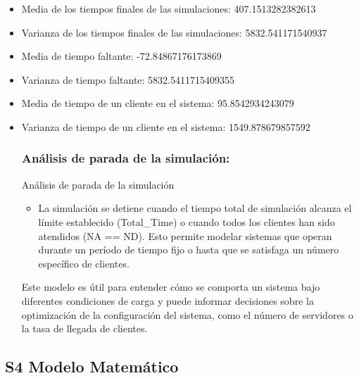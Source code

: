 \documentclass[
]{article}
\providecommand{\tightlist}{%
  \setlength{\itemsep}{0pt}\setlength{\parskip}{0pt}}
\begin{document}
\begin{itemize}
 \item
 Media de los tiempos finales de las simulaciones: 407.1513282382613
 \item
 Varianza de los tiempos finales de las simulaciones: 5832.541171540937
 \item
 Media de tiempo faltante: -72.84867176173869
 \item
 Varianza de tiempo faltante: 5832.5411715409355
 \item
 Media de tiempo de un cliente en el sistema: 95.8542934243079
 \item
 Varianza de tiempo de un cliente en el sistema: 1549.878679857592


 \hypertarget{anal-parada}{%
 \subsubsection{Análisis de parada de la simulación:}\label{anal-parada}}
  Análisis de parada de la simulación

  \begin{itemize}
  \tightlist
  \item
    La simulación se detiene cuando el tiempo total de simulación
    alcanza el límite establecido (Total\_Time) o cuando todos los
    clientes han sido atendidos (NA == ND). Esto permite modelar
    sistemas que operan durante un período de tiempo fijo o hasta que se
    satisfaga un número específico de clientes.
  \end{itemize}

  Este modelo es útil para entender cómo se comporta un sistema bajo
  diferentes condiciones de carga y puede informar decisiones sobre la
  optimización de la configuración del sistema, como el número de
  servidores o la tasa de llegada de clientes.
\end{itemize}

\hypertarget{s4-modelo-matemuxe1tico}{%
\subsection{S4 Modelo Matemático}\label{s4-modelo-matemuxe1tico}}
\end{document}
